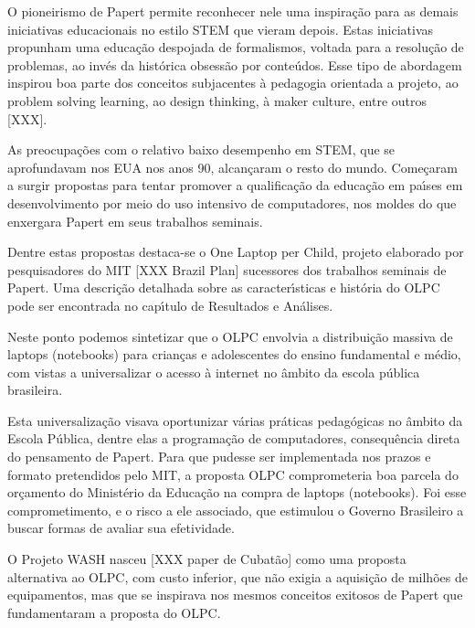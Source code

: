 \documentclass[
12pt,		%
openright,	%
twoside,  %
a4paper,			%
chapter=TITLE,		%
english,			%
french,				%
spanish,			%
brazil				%
]{USPSC-classe/USPSC}
\begin{document}
O pioneirismo de Papert permite reconhecer nele uma inspira\c{c}\~ao para as demais iniciativas educacionais no estilo STEM que vieram depois. Estas iniciativas propunham uma educa\c{c}\~ao despojada de formalismos, voltada para a resolu\c{c}\~ao de problemas, ao inv\'es da hist\'orica obsess\~ao por conte\'udos. Esse tipo de abordagem inspirou boa parte dos conceitos subjacentes \`a \textquotedbl pedagogia orientada a projeto\textquotedbl [XXX], ao \textquotedbl problem solving learning\textquotedbl [XXX], ao \textquotedbl design thinking, \`a \textquotedbl maker culture\textquotedbl , entre outros [XXX].


As preocupa\c{c}\~oes com o relativo baixo desempenho em STEM, que se aprofundavam nos EUA nos anos 90, alcan\c{c}aram o resto do mundo. Come\c{c}aram a surgir propostas para tentar promover a qualifica\c{c}\~ao da educa\c{c}\~ao em pa\'{\i}ses em desenvolvimento por meio do uso intensivo de computadores, nos moldes do que enxergara Papert em seus trabalhos seminais.


Dentre estas propostas destaca-se o \textquotedbl One Laptop per Child\textquotedbl , projeto elaborado por pesquisadores do MIT [XXX Brazil Plan] sucessores dos trabalhos seminais de Papert. Uma descri\c{c}\~ao detalhada sobre as caracter\'{\i}sticas e hist\'oria do OLPC pode ser encontrada no cap\'{\i}tulo de Resultados e An\'alises.


Neste ponto podemos sintetizar que o OLPC envolvia a distribui\c{c}\~ao massiva de laptops (notebooks) para crian\c{c}as e adolescentes do  ensino fundamental e m\'edio, com vistas a universalizar o acesso \`a internet no \^ambito da escola p\'ublica brasileira.


Esta universaliza\c{c}\~ao visava oportunizar v\'arias pr\'aticas pedag\'ogicas no \^ambito da Escola P\'ublica, dentre elas a programa\c{c}\~ao de computadores, consequ\^encia direta do pensamento de Papert. Para que pudesse ser implementada nos prazos e formato pretendidos pelo MIT, a proposta OLPC comprometeria boa parcela do or\c{c}amento do Minist\'erio da Educa\c{c}\~ao na compra de laptops (notebooks). Foi esse comprometimento, e o risco a ele associado, que estimulou o Governo Brasileiro a buscar formas de avaliar sua efetividade.


O Projeto WASH nasceu [XXX paper de Cubat\~ao] como uma proposta alternativa ao OLPC, com custo inferior, que n\~ao exigia a aquisi\c{c}\~ao de milh\~oes de equipamentos, mas que se inspirava nos mesmos conceitos exitosos de Papert que fundamentaram a proposta do OLPC.
\end{document}
